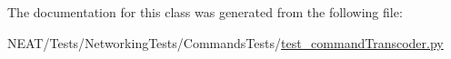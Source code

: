 The documentation for this class was generated from the following file\+:\begin{DoxyCompactItemize}
\item 
N\+E\+A\+T/\+Tests/\+Networking\+Tests/\+Commands\+Tests/\hyperlink{test__commandTranscoder_8py}{test\+\_\+command\+Transcoder.\+py}\end{DoxyCompactItemize}
